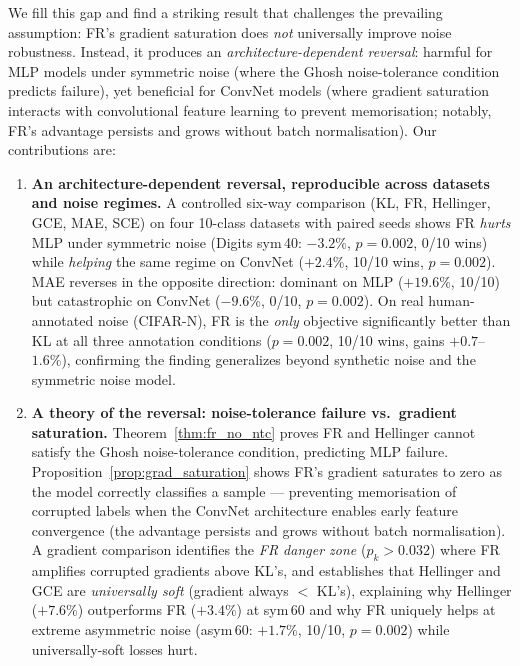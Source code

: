 \documentclass[11pt]{article}
\begin{document}
We fill this gap and find a striking result that challenges the prevailing
assumption: FR's gradient saturation does \emph{not} universally improve noise
robustness.
Instead, it produces an \emph{architecture-dependent reversal}: harmful for
MLP models under symmetric noise (where the Ghosh noise-tolerance condition
predicts failure), yet beneficial for ConvNet models (where gradient saturation
interacts with convolutional feature learning to prevent memorisation;
notably, FR's advantage persists and grows without batch normalisation).
Our contributions are:
\begin{enumerate}
  \item \textbf{An architecture-dependent reversal, reproducible across datasets and
    noise regimes.}
    A controlled six-way comparison (KL, FR, Hellinger, GCE, MAE, SCE) on four
    10-class datasets with paired seeds shows FR \emph{hurts} MLP under symmetric
    noise (Digits sym\,40: $-3.2\%$, $p=0.002$, 0/10 wins) while \emph{helping} the
    same regime on ConvNet ($+2.4\%$, 10/10 wins, $p=0.002$).
    MAE reverses in the opposite direction: dominant on MLP ($+19.6\%$, 10/10) but
    catastrophic on ConvNet ($-9.6\%$, 0/10, $p=0.002$).
    On real human-annotated noise (CIFAR-N), FR is the \emph{only} objective
    significantly better than KL at all three annotation conditions
    ($p=0.002$, 10/10 wins, gains $+0.7$--$1.6\%$), confirming the finding
    generalizes beyond synthetic noise and the symmetric noise model.

  \item \textbf{A theory of the reversal: noise-tolerance failure vs.\ gradient saturation.}
    Theorem~\ref{thm:fr_no_ntc} proves FR and Hellinger cannot satisfy the Ghosh
    noise-tolerance condition, predicting MLP failure.
    Proposition~\ref{prop:grad_saturation} shows FR's gradient saturates to zero as
    the model correctly classifies a sample — preventing memorisation of corrupted
    labels when the ConvNet architecture enables early feature convergence
    (the advantage persists and grows without batch normalisation).
    A gradient comparison identifies the \emph{FR danger zone} ($p_k > 0.032$) where
    FR amplifies corrupted gradients above KL's, and establishes that Hellinger and
    GCE are \emph{universally soft} (gradient always $<$ KL's), explaining why
    Hellinger ($+7.6\%$) outperforms FR ($+3.4\%$) at sym\,60 and why FR uniquely
    helps at extreme asymmetric noise (asym\,60: $+1.7\%$, 10/10, $p=0.002$) while
    universally-soft losses hurt.


\end{enumerate}
\end{document}
